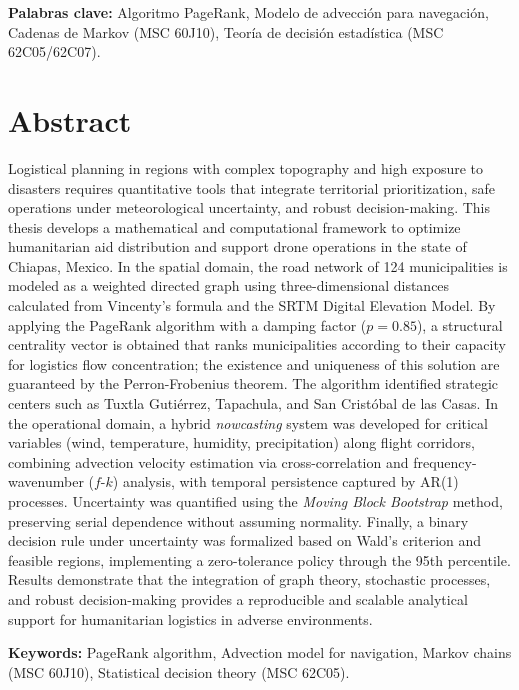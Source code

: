 \documentclass[
  spanish,
  us-letterpaper,
]{scrreprt}
\numberwithin{equation}{section}
\begin{document}
\textbf{Palabras clave:} Algoritmo PageRank, Modelo de advección para
navegación, Cadenas de Markov (MSC 60J10), Teoría de decisión
estadística (MSC 62C05/62C07).

\section*{Abstract}\label{abstract}


Logistical planning in regions with complex topography and high exposure
to disasters requires quantitative tools that integrate territorial
prioritization, safe operations under meteorological uncertainty, and
robust decision-making. This thesis develops a mathematical and
computational framework to optimize humanitarian aid distribution and
support drone operations in the state of Chiapas, Mexico. In the spatial
domain, the road network of 124 municipalities is modeled as a weighted
directed graph using three-dimensional distances calculated from
Vincenty's formula and the SRTM Digital Elevation Model. By applying the
PageRank algorithm with a damping factor (\(p=0.85\)), a structural
centrality vector is obtained that ranks municipalities according to
their capacity for logistics flow concentration; the existence and
uniqueness of this solution are guaranteed by the Perron-Frobenius
theorem. The algorithm identified strategic centers such as Tuxtla
Gutiérrez, Tapachula, and San Cristóbal de las Casas. In the operational
domain, a hybrid \emph{nowcasting} system was developed for critical
variables (wind, temperature, humidity, precipitation) along flight
corridors, combining advection velocity estimation via cross-correlation
and frequency-wavenumber (\(f\)-\(k\)) analysis, with temporal
persistence captured by AR(1) processes. Uncertainty was quantified
using the \emph{Moving Block Bootstrap} method, preserving serial
dependence without assuming normality. Finally, a binary decision rule
under uncertainty was formalized based on Wald's criterion and feasible
regions, implementing a zero-tolerance policy through the 95th
percentile. Results demonstrate that the integration of graph theory,
stochastic processes, and robust decision-making provides a reproducible
and scalable analytical support for humanitarian logistics in adverse
environments.

\textbf{Keywords:} PageRank algorithm, Advection model for navigation,
Markov chains (MSC 60J10), Statistical decision theory (MSC 62C05).
\end{document}
